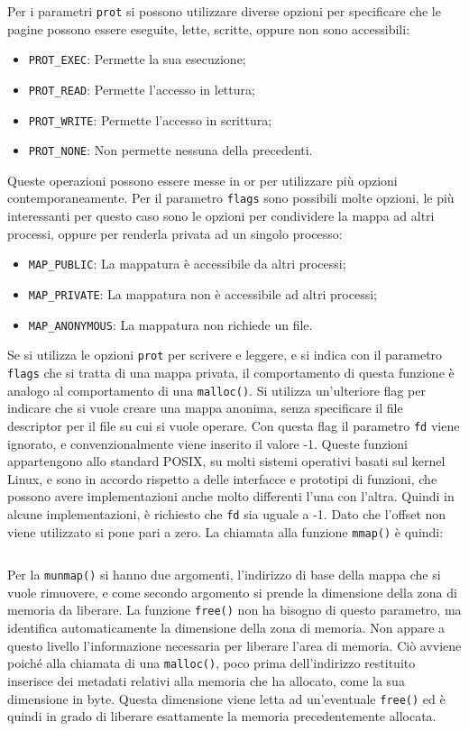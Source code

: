 \documentclass{article}
\numberwithin{equation}{subsection}
\begin{document}
Per i parametri \verb|prot| si possono utilizzare diverse opzioni per 
specificare che le pagine possono essere eseguite, lette, scritte, oppure non sono 
accessibili:
\begin{itemize}
    \item \verb|PROT_EXEC|: Permette la sua esecuzione;
    \item \verb|PROT_READ|: Permette l'accesso in lettura;
    \item \verb|PROT_WRITE|: Permette l'accesso in scrittura;
    \item \verb|PROT_NONE|: Non permette nessuna della precedenti. 
\end{itemize}
Queste operazioni possono essere messe in or per utilizzare più opzioni 
contemporaneamente. Per il parametro \verb|flags| sono possibili molte opzioni, le 
più interessanti per questo caso sono le opzioni per condividere la mappa ad altri processi, oppure per renderla privata ad un singolo processo:
\begin{itemize}
    \item \verb|MAP_PUBLIC|: La mappatura è accessibile da altri processi;
    \item \verb|MAP_PRIVATE|: La mappatura non è accessibile ad altri processi;
    \item \verb|MAP_ANONYMOUS|: La mappatura non richiede un file.
\end{itemize} 
Se si utilizza le opzioni \verb|prot| per scrivere e leggere, e si indica con il parametro \verb|flags| che si tratta di una mappa privata, il comportamento di questa funzione è analogo al 
comportamento di una \verb|malloc()|. 
Si utilizza un'ulteriore flag per indicare che si vuole creare una mappa anonima, senza 
specificare il file descriptor per il file su cui si vuole operare. Con questa flag il parametro 
\verb|fd| viene ignorato, e convenzionalmente viene inserito il valore -1. 
Queste funzioni appartengono allo standard POSIX, su molti sistemi operativi basati sul kernel Linux, e sono in accordo rispetto a delle interfacce e prototipi di funzioni, che possono 
avere implementazioni anche molto differenti l'una con l'altra. Quindi in alcune implementazioni, è richiesto che \verb|fd| sia uguale a -1. Dato che l'offset non viene utilizzato si pone pari a zero. La chiamata alla funzione \verb|mmap()| è quindi:
\inputminted[firstline=32,lastline=33]{c}{./"Esercitazione del 19-11-24"/domanda4.c}

Per la \verb|munmap()| si hanno due argomenti, l'indirizzo di base della mappa che si vuole 
rimuovere, e come secondo argomento si prende la dimensione della zona di memoria da liberare. La funzione \verb|free()| non ha bisogno di questo parametro, ma identifica automaticamente la 
dimensione della zona di memoria. Non appare a questo livello l'informazione necessaria per liberare l'area di memoria. 
Ciò avviene poiché alla chiamata di una \verb|malloc()|, poco prima dell'indirizzo restituito 
inserisce dei metadati relativi alla memoria che ha allocato, come la sua dimensione in byte. 
Questa dimensione viene letta ad un'eventuale \verb|free()| ed è quindi in grado di liberare 
esattamente la memoria precedentemente allocata. 
\end{document}
